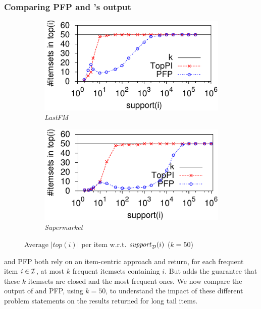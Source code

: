 \subsubsection{Comparing PFP and \toppi's output}

\begin{figure}
	\centering
	\begin{subfigure}[b]{0.48\textwidth}
		\includegraphics{fig/toppi/averagePatternsInTopKPerItem/lastfm-s2-k50.pdf}
		\caption{\em LastFM}
	\end{subfigure}
	\hfill
	\begin{subfigure}[b]{0.48\textwidth}
		\includegraphics{fig/toppi/averagePatternsInTopKPerItem/supermarket-s2-k50.pdf}
		\caption{\em Supermarket}
	\end{subfigure}
	\caption{\label{fig:topKsize}
		Average $|\mathit{top}(i)|$ per item w.r.t. $\mathit{support}_{\cal D}(i)$ ($k=50$)
	}
\end{figure}



\toppi and PFP both rely on an item-centric approach and return,
for each frequent item $i \in {\cal I}$, at most $k$ frequent itemsets containing $i$.
But \toppi adds the guarantee that these $k$ itemsets are closed and the most frequent ones.
We now compare the output of \toppi and PFP, using $k=50$,
to understand the impact
of these different problem statements on the results returned for long tail items.

